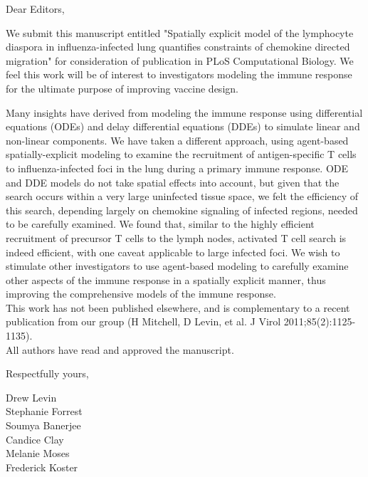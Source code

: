 \documentclass[10pt]{article}
\date{}
\begin{document}
\begin{flushleft}Dear Editors, \end{flushleft} 

We submit this manuscript entitled "Spatially explicit model of the lymphocyte diaspora in influenza-infected lung quantifies constraints of chemokine directed migration" for consideration of publication in PLoS Computational Biology.  We feel this work will be of interest to investigators modeling the immune response for the ultimate purpose of improving vaccine design.  

Many insights have derived from modeling the immune response using differential equations (ODEs) and delay differential equations (DDEs) to simulate linear and non-linear components.  We have taken a different approach, using agent-based spatially-explicit modeling to examine the recruitment of antigen-specific T cells to influenza-infected foci in the lung during a primary immune response.   ODE and DDE models do not take spatial effects into account, but given that the search occurs within a very large uninfected tissue space, we felt the efficiency of this search, depending largely on chemokine signaling of infected regions, needed to be carefully examined.  We found that, similar to the highly efficient recruitment of precursor T cells to the lymph nodes, activated T cell search is indeed efficient, with one caveat applicable to large infected foci.  We wish to stimulate other investigators to use agent-based modeling to carefully examine other aspects of the immune response in a spatially explicit manner, thus improving the comprehensive models of the immune response. \\

This work has not been published elsewhere, and is complementary to a recent publication from our group (H Mitchell, D Levin, et al. J Virol 2011;85(2):1125-1135). \\

All authors have read and approved the manuscript. 

\begin{flushleft}Respectfully yours,\end{flushleft}
Drew Levin \\
Stephanie Forrest \\
Soumya Banerjee \\
Candice Clay \\
Melanie Moses \\
Frederick Koster
\end{document}
